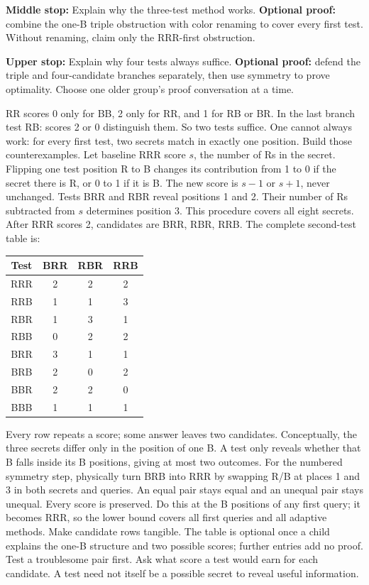 \documentclass[11pt]{article}
\begin{document}
\textbf{Middle stop:} Explain why the three-test method works. \textbf{Optional proof:} combine the one-B triple obstruction with color renaming to cover every first test. Without renaming, claim only the RRR-first obstruction.

\textbf{Upper stop:} Explain why four tests always suffice. \textbf{Optional proof:} defend the triple and four-candidate branches separately, then use symmetry to prove optimality. Choose one older group's proof conversation at a time.

\newpage
{}
RR scores 0 only for BB, 2 only for RR, and 1 for RB or BR. In the last branch test RB: scores 2 or 0 distinguish them. So two tests suffice. One cannot always work: for every first test, two secrets match in exactly one position. Build those counterexamples.
Let baseline RRR score \(s\), the number of Rs in the secret. Flipping one test position R to B changes its contribution from 1 to 0 if the secret there is R, or 0 to 1 if it is B. The new score is \(s-1\) or \(s+1\), never unchanged. Tests BRR and RBR reveal positions 1 and 2. Their number of Rs subtracted from \(s\) determines position 3. This procedure covers all eight secrets.
After RRR scores 2, candidates are BRR, RBR, RRB. The complete second-test table is:
\begin{center}\renewcommand{\arraystretch}{1.25}\begin{tabular}{c|ccc}Test&BRR&RBR&RRB\\\hline RRR&2&2&2\\RRB&1&1&3\\RBR&1&3&1\\RBB&0&2&2\\BRR&3&1&1\\BRB&2&0&2\\BBR&2&2&0\\BBB&1&1&1\end{tabular}\end{center}
Every row repeats a score; some answer leaves two candidates. Conceptually, the three secrets differ only in the position of one B. A test only reveals whether that B falls inside its B positions, giving at most two outcomes. For the numbered symmetry step, physically turn BRB into RRR by swapping R/B at places 1 and 3 in both secrets and queries. An equal pair stays equal and an unequal pair stays unequal. Every score is preserved. Do this at the B positions of any first query; it becomes RRR, so the lower bound covers all first queries and all adaptive methods.
Make candidate rows tangible. The table is optional once a child explains the one-B structure and two possible scores; further entries add no proof. Test a troublesome pair first. Ask what score a test would earn for each candidate. A test need not itself be a possible secret to reveal useful information.
\end{document}

